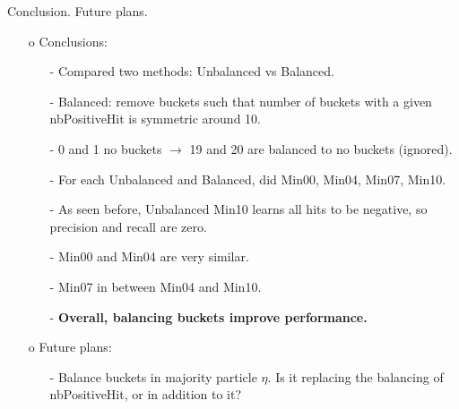\documentclass{beamer}
\begin{document}
\begin{frame}{Conclusion. Future plans.}
\begin{enumerate}
\item[o] Conclusions:
  \begin{enumerate}
\item[-] Compared two methods: Unbalanced vs Balanced.
\item[-] Balanced: remove buckets such that number of buckets with a given nbPositiveHit is symmetric around 10.
\item[-] 0 and 1 no buckets $\rightarrow$ 19 and 20 are balanced to no buckets (ignored). 
\item[-] For each Unbalanced and Balanced, did Min00, Min04, Min07, Min10.
\item[-] As seen before, Unbalanced Min10 learns all hits to be negative, so precision and recall are zero.
\item[-] Min00 and Min04 are very similar.
\item[-] Min07 in between Min04 and Min10.
\item[-] \textbf{Overall, balancing buckets improve performance.}
\end{enumerate}
\item[o] Future plans:
\begin{enumerate}
\item[-] Balance buckets in majority particle $\eta$. Is it replacing the balancing of nbPositiveHit, or in addition to it?
\end{enumerate}
\end{enumerate}
\end{frame}
\end{document}
